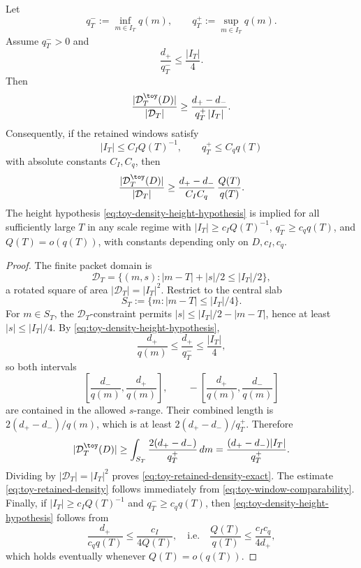 \begin{lemma}
\label{lem:toy-retained-density}
Let
\[
        q_T^-:=\inf_{m\in I_T}q(m),
        \qquad
        q_T^+:=\sup_{m\in I_T}q(m).
\]
Assume \(q_T^->0\) and
\begin{equation}
\label{eq:toy-density-height-hypothesis}
        \frac{d_+}{q_T^-}\le \frac{|I_T|}{4}.
\end{equation}
Then
\begin{equation}
\label{eq:toy-retained-density-exact}
        \frac{|\mathcal D_T^\toy(D)|}{|\mathcal D_T|}
        \ge
        \frac{d_+-d_-}{q_T^+\,|I_T|}.
\end{equation}
Consequently, if the retained windows satisfy
\begin{equation}
\label{eq:toy-window-comparability}
        |I_T|\le C_I Q(T)^{-1},
        \qquad
        q_T^+\le C_q q(T)
\end{equation}
with absolute constants \(C_I,C_q\), then
\begin{equation}
\label{eq:toy-retained-density}
        \frac{|\mathcal D_T^\toy(D)|}{|\mathcal D_T|}
        \ge
        \frac{d_+-d_-}{C_I C_q}\,\frac{Q(T)}{q(T)}.
\end{equation}
The height hypothesis \eqref{eq:toy-density-height-hypothesis} is
implied for all sufficiently large \(T\) in any scale regime with
\(|I_T|\ge c_I Q(T)^{-1}\), \(q_T^-\ge c_q q(T)\), and
\(Q(T)=o(q(T))\), with constants depending only on \(D,c_I,c_q\).
\end{lemma}

\begin{proof}
The finite packet domain is
\[
    \mathcal D_T
    =\bigl\{(m,s): |m-T|+|s|/2\le |I_T|/2\bigr\},
\]
a rotated square of area \(|\mathcal D_T|=|I_T|^2\).  Restrict to the
central slab
\[
        S_T:=\{m: |m-T|\le |I_T|/4\}.
\]
For \(m\in S_T\), the \(\mathcal D_T\)-constraint permits
\(|s|\le |I_T|/2-|m-T|\), hence at least \(|s|\le |I_T|/4\).  By
\eqref{eq:toy-density-height-hypothesis},
\[
        \frac{d_+}{q(m)}\le \frac{d_+}{q_T^-}\le \frac{|I_T|}{4},
\]
so both intervals
\[
        \left[\frac{d_-}{q(m)},\frac{d_+}{q(m)}\right],
        \qquad
        -\left[\frac{d_+}{q(m)},\frac{d_-}{q(m)}\right]
\]
are contained in the allowed \(s\)-range.  Their combined length is
\(2(d_+-d_-)/q(m)\), which is at least \(2(d_+-d_-)/q_T^+\).  Therefore
\[
        |\mathcal D_T^\toy(D)|
        \ge \int_{S_T}\frac{2(d_+-d_-)}{q_T^+}\,dm
        =\frac{(d_+-d_-)|I_T|}{q_T^+}.
\]
Dividing by \(|\mathcal D_T|=|I_T|^2\) proves
\eqref{eq:toy-retained-density-exact}.  The estimate
\eqref{eq:toy-retained-density} follows immediately from
\eqref{eq:toy-window-comparability}.  Finally, if
\(|I_T|\ge c_IQ(T)^{-1}\) and \(q_T^-\ge c_q q(T)\), then
\eqref{eq:toy-density-height-hypothesis} follows from
\[
        \frac{d_+}{c_q q(T)}\le \frac{c_I}{4Q(T)},
        \quad\text{i.e.}\quad
        \frac{Q(T)}{q(T)}\le \frac{c_Ic_q}{4d_+},
\]
which holds eventually whenever \(Q(T)=o(q(T))\).
\end{proof}

